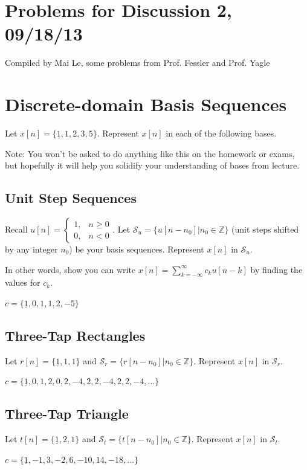 \documentclass[11pt]{article}
\begin{document}
\section*{Problems for Discussion 2, 09/18/13}
Compiled by Mai Le, some problems from Prof. Fessler and Prof. Yagle

\section{Discrete-domain Basis Sequences}
Let $x[n] = \{\underline{1},1,2,3,5\}$. Represent $x[n]$ in each of the following bases. 

Note: You won't be asked to do anything like this on the homework or exams, but hopefully it will help you solidify your understanding of bases from lecture.

\subsection*{Unit Step Sequences}
Recall $u[n] = \begin{cases}1, & n \geq 0\\ 0, & n < 0 \end{cases}$. Let $\mathcal{S}_u = \{u[n-n_0]|n_0 \in \mathbb{Z}\}$ (unit steps shifted by any integer $n_0$) be your basis sequences. Represent $x[n]$ in $\mathcal{S}_u$.

In other words, show you can write $x[n]=\sum\limits_{k=-\infty}^\infty c_k u[n-k]$ by finding the values for $c_k$.

{\color{blue}
$c = \{\underline{1}, 0, 1, 1, 2, -5\}$
}

\subsection*{Three-Tap Rectangles}
Let $r[n] = \{\underline{1},1,1\}$ and $\mathcal{S}_r = \{r[n-n_0]|n_0 \in \mathbb{Z}\}$. Represent $x[n]$ in $\mathcal{S}_r$.

{\color{blue}
$c = \{\underline{1}, 0, 1, 2, 0, 2, -4, 2, 2, -4, 2, 2, -4, \ldots \}$
}

\subsection*{Three-Tap Triangle}
Let $t[n] = \{\underline{1},2,1\}$ and $\mathcal{S}_t = \{t[n-n_0]|n_0 \in \mathbb{Z}\}$. Represent $x[n]$ in $\mathcal{S}_t$.

{\color{blue}
$c = \{\underline{1}, -1, 3, -2, 6, -10, 14, -18, \ldots \}$
}
\end{document}
